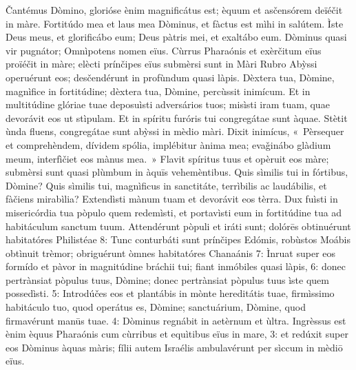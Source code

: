 Čantémus Dòmino, glorióse ènim magnificátus est; èquum et asčensórem deïéčit in màre. 
Fortitúdo mea et laus mea Dòminus, et fàctus est mìhi in salútem. Ìste Deus meus, et glorificábo eum; Deus pàtris mei, et exaltábo eum. 
Dòminus quasi vir pugnátor; Omnìpotens nomen eïus. 
Cùrrus Pharaónis et exèrčitum eïus proïéčit in màre; elècti prínčipes eïus submèrsi sunt in Màri Rubro 
Abỳssi operuérunt eos; desčendérunt in profùndum quasi làpis. 
Dèxtera tua, Dòmine, magnìfice in fortitúdine; dèxtera tua, Dòmine, percùssit inimícum. 
Et in multitúdine glóriae tuae deposuìsti adversários tuos; misìsti iram tuam, quae devorávit eos ut stìpulam. 
Et in spíritu furóris tui congregátae sunt àquae. 
Stètit ùnda fluens, congregátae sunt abỳssi in mèdio màri. 
Dixit inimícus, «~Pèrsequer et comprehèndem, dívidem spólia, implébitur ànima mea; evaǧinábo glàdium meum, interfìčiet eos mànus mea.~»
Flavit spíritus tuus et opèruit eos màre; submèrsi sunt quasi plùmbum in àquīs vehemèntibus. 
Quis sìmilis tui in fórtibus, Dòmine? Quis sìmilis tui, magnìficus in sanctitáte, terrìbilis ac laudábilis, et fàčiens mirabìlia? 
Extendìsti mànum tuam et devorávit eos tèrra. Dux fuìsti in misericórdia tua pòpulo quem redemìsti, 
et portavìsti eum in fortitúdine tua ad habitáculum sanctum tuum. Attendérunt pòpuli et iráti sunt; dolórēs obtinuérunt habitatóres Philistéae 
8: Tunc conturbáti sunt prínčipes Edómis, robùstos Moábis obtìnuit trèmor; obriguérunt òmnes habitatóres Chanaánis 
7: Ìnruat super eos formído et pàvor in magnitúdine bráchii tui; fiant inmóbiles quasi làpis, 
6: donec pertrànsiat pòpulus tuus, Dòmine; donec pertrànsiat pòpulus tuus ìste quem possedìsti. 
5: Introdúčes eos et plantábis in mònte hereditátis tuae, firmìssimo habitáculo tuo, quod operátus es, Dòmine; sanctuárium, Dòmine, quod firmavérunt manūs tuae. 
4: Dòminus regnábit in aetèrnum et ùltra. Ingrèssus est ènim èquus Pharaónis cum cùrribus et equìtibus eïus in mare, 
3: et redúxit super eos Dòminus àquas màris; fílii autem Israélis ambulavérunt per sìccum in mèdiō eïus.
